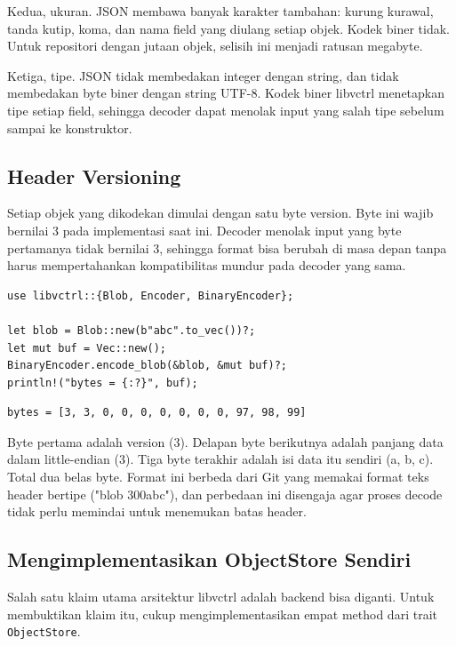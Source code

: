 \documentclass[11pt,a4paper]{article}
\begin{document}
Kedua, ukuran. JSON membawa banyak karakter tambahan: kurung kurawal, tanda kutip, koma, dan nama field yang diulang setiap objek. Kodek biner tidak. Untuk repositori dengan jutaan objek, selisih ini menjadi ratusan megabyte.

Ketiga, tipe. JSON tidak membedakan integer dengan string, dan tidak membedakan byte biner dengan string UTF-8. Kodek biner libvctrl menetapkan tipe setiap field, sehingga decoder dapat menolak input yang salah tipe sebelum sampai ke konstruktor.

\subsection{Header Versioning}

Setiap objek yang dikodekan dimulai dengan satu byte version. Byte ini wajib bernilai 3 pada implementasi saat ini. Decoder menolak input yang byte pertamanya tidak bernilai 3, sehingga format bisa berubah di masa depan tanpa harus mempertahankan kompatibilitas mundur pada decoder yang sama.

\begin{lstlisting}[style=code]
use libvctrl::{Blob, Encoder, BinaryEncoder};

let blob = Blob::new(b"abc".to_vec())?;
let mut buf = Vec::new();
BinaryEncoder.encode_blob(&blob, &mut buf)?;
println!("bytes = {:?}", buf);
\end{lstlisting}

\begin{lstlisting}[style=out]
bytes = [3, 3, 0, 0, 0, 0, 0, 0, 0, 97, 98, 99]
\end{lstlisting}

Byte pertama adalah version (3). Delapan byte berikutnya adalah panjang data dalam little-endian (3). Tiga byte terakhir adalah isi data itu sendiri (a, b, c). Total dua belas byte. Format ini berbeda dari Git yang memakai format teks header bertipe ("blob 3\x00abc"), dan perbedaan ini disengaja agar proses decode tidak perlu memindai untuk menemukan batas header.

\subsection{Mengimplementasikan ObjectStore Sendiri}

Salah satu klaim utama arsitektur libvctrl adalah backend bisa diganti. Untuk membuktikan klaim itu, cukup mengimplementasikan empat method dari trait \texttt{ObjectStore}.
\end{document}
